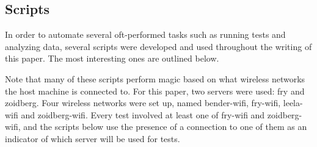 \subsection{Scripts}
In order to automate several oft-performed tasks such as running tests and
analyzing data, several scripts were developed and used throughout the writing
of this paper. The most interesting ones are outlined below.

Note that many of these scripts perform magic based on what wireless networks
the host machine is connected to. For this paper, two servers were used: fry and
zoidberg. Four wireless networks were set up, named bender-wifi, fry-wifi,
leela-wifi and zoidberg-wifi. Every test involved at least one of fry-wifi and
zoidberg-wifi, and the scripts below use the presence of a connection to one of
them as an indicator of which server will be used for tests.

